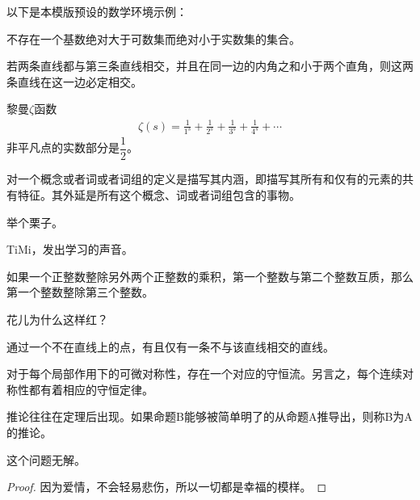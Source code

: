 以下是本模版预设的数学环境示例：

\begin{assumption}[连续统假设]
    不存在一个基数绝对大于可数集而绝对小于实数集的集合。
\end{assumption}
\begin{axiom}[平行公理]
    若两条直线都与第三条直线相交，并且在同一边的内角之和小于两个直角，则这两条直线在这一边必定相交。
\end{axiom}
\begin{conjecture}[黎曼猜想]
    黎曼$\zeta$函数
    \begin{align}
        \zeta(s) = \frac{1}{1^s} + \frac{1}{2^s} + \frac{1}{3^s} + \frac{1}{4^s} + \cdots
    \end{align}
    非平凡点的实数部分是$\dfrac{1}{2}$。
\end{conjecture}
\begin{definition}[定义的定义]
    对一个概念或者词或者词组的定义是描写其内涵，即描写其所有和仅有的元素的共有特征。其外延是所有这个概念、词或者词组包含的事物。
\end{definition}
\begin{example}
    举个栗子。
\end{example}
\begin{exercise}
    TiMi，发出学习的声音。
\end{exercise}
\begin{lemma}[欧几里得引理]
    如果一个正整数整除另外两个正整数的乘积，第一个整数与第二个整数互质，那么第一个整数整除第三个整数。
\end{lemma}
\begin{problem}
    花儿为什么这样红？
\end{problem}
\begin{proposition}
    通过一个不在直线上的点，有且仅有一条不与该直线相交的直线。
\end{proposition}
\begin{theorem}[诺特定理]
    对于每个局部作用下的可微对称性，存在一个对应的守恒流。另言之，每个连续对称性都有着相应的守恒定律。
\end{theorem}
\begin{corollary}
    推论往往在定理后出现。如果命题B能够被简单明了的从命题A推导出，则称B为A的推论。
\end{corollary}
\begin{solution}
    这个问题无解。
\end{solution}
\begin{proof}
    因为爱情，不会轻易悲伤，所以一切都是幸福的模样。
\end{proof}

